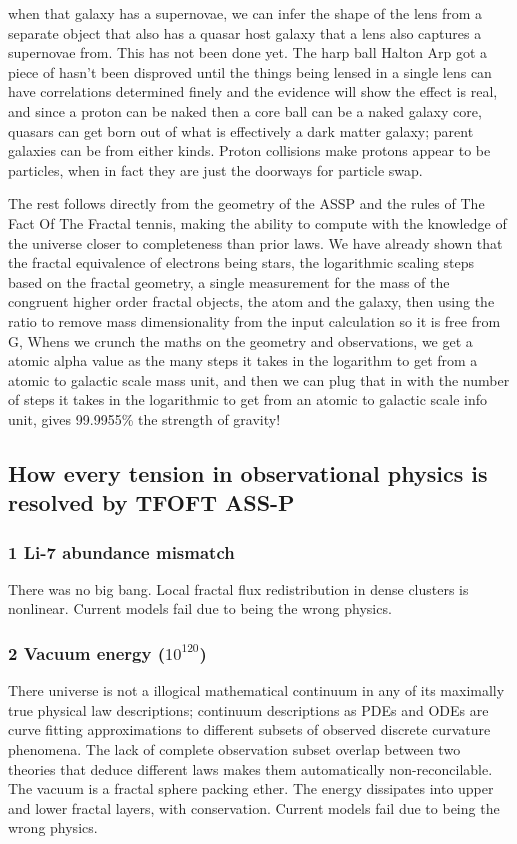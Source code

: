\documentclass[11pt,a4paper]{article}
\begin{document}
when that galaxy has a supernovae, we can infer the shape of the lens
from a separate object that also has a quasar host galaxy that a lens
also captures a supernovae from. This has not been done yet. The harp
ball Halton Arp got a piece of hasn't been disproved until the things
being lensed in a single lens can have correlations determined finely
and the evidence will show the effect is real, and since a proton can
be naked then a core ball can be a naked galaxy core, quasars can get
born out of what is effectively a dark matter galaxy; parent galaxies
can be from either kinds. Proton collisions make protons appear to be
particles, when in fact they are just the doorways for particle swap.

The rest follows directly from the geometry of the ASSP and the rules
of The Fact Of The Fractal tennis, making the ability to compute with
the knowledge of the universe closer to completeness than prior laws. 
We have already shown that the fractal equivalence of electrons being
stars, the logarithmic scaling steps based on the fractal geometry, a
single measurement for the mass of the congruent higher order fractal
objects, the atom and the galaxy, then using the ratio to remove mass
dimensionality from the input calculation so it is free from G, Whens
we crunch the maths on the geometry and observations, we get a atomic
alpha value as the many steps it takes in the logarithm to get from a
atomic to galactic scale mass unit, and then we can plug that in with
the number of steps it takes in the logarithmic to get from an atomic
to galactic scale info unit, gives 99.9955\% the strength of gravity!

\subsection{
How every tension in observational physics is resolved by TFOFT ASS-P 
}

\subsubsection{
1 Li-7 abundance mismatch 
}
There was no big bang. Local fractal flux redistribution in dense clusters is nonlinear. Current models fail due to being the wrong physics.

\subsubsection{
2 Vacuum energy ($10^{120}$)
}
There universe is not a illogical mathematical continuum in any of its maximally true physical law descriptions; continuum descriptions as PDEs and ODEs are curve fitting approximations to different subsets of observed discrete curvature phenomena. The lack of complete observation subset overlap between two theories that deduce different laws makes them automatically non-reconcilable. The vacuum is a fractal sphere packing ether. The energy dissipates into upper and lower fractal layers, with conservation. Current models fail due to being the wrong physics.
\end{document}
